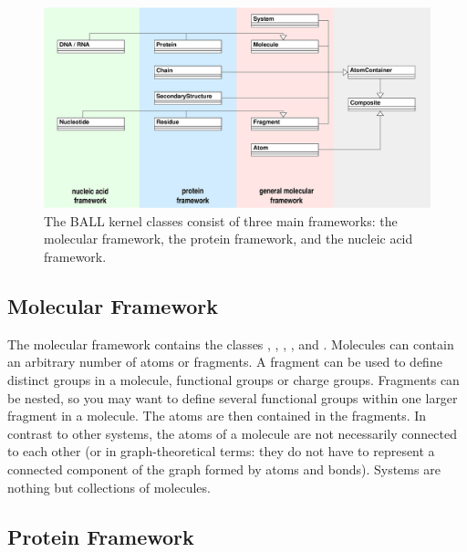 \begin{figure}[tb]
  \centering\includegraphics[width=\textwidth]{kernel-data-structures.eps}
  \caption{The BALL kernel classes consist of three main frameworks: the
           molecular framework, the protein framework, and the nucleic acid
           framework.}
  \label{figure:kernel-frameworks}
\end{figure}


\subsection{Molecular Framework}
\label{section:molecularframework}

The molecular framework contains the classes ,
, , , and . 
Molecules can contain an arbitrary number of atoms or fragments. A fragment
can be used to define distinct groups in a molecule, \eg functional groups or
charge groups. Fragments can be nested, so you may want to define several
functional groups within one larger fragment in a molecule. The atoms are then
contained in the fragments. In contrast to other systems, the atoms of a
molecule are not necessarily connected to each other (or in graph-theoretical
terms: they do not have to represent a connected component of the graph
formed by atoms and bonds). Systems are nothing but collections of molecules.


\subsection{Protein Framework}
\label{section:proteinframework}

